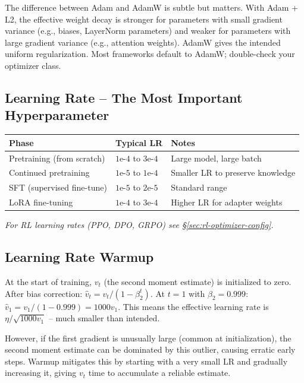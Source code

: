 \begin{warningbox}
The difference between Adam and AdamW is subtle but matters. With Adam + L2, the effective weight decay is stronger for parameters with small gradient variance (e.g., biases, LayerNorm parameters) and weaker for parameters with large gradient variance (e.g., attention weights). AdamW gives the intended uniform regularization. Most frameworks default to AdamW; double-check your optimizer class.
\end{warningbox}

\newpage
\subsection{Learning Rate -- The Most Important Hyperparameter}
\label{learning-rate-the-most-important-hyperparameter}

\begin{keybox}
\begin{tabular}{@{}lp{4cm}p{5.5cm}@{}}
\toprule
\textbf{Phase} & \textbf{Typical LR} & \textbf{Notes} \\
\midrule
Pretraining (from scratch) & $1\text{e-}4$ to $3\text{e-}4$ & Large model, large batch \\
Continued pretraining & $1\text{e-}5$ to $1\text{e-}4$ & Smaller LR to preserve knowledge \\
SFT (supervised fine-tune) & $1\text{e-}5$ to $2\text{e-}5$ & Standard range \\
LoRA fine-tuning & $1\text{e-}4$ to $3\text{e-}4$ & Higher LR for adapter weights \\
\bottomrule
\end{tabular}

\smallskip
\noindent\emph{For RL learning rates (PPO, DPO, GRPO) see §\ref{sec:rl-optimizer-config}.}
\end{keybox}

\subsection{Learning Rate Warmup}
\label{learning-rate-warmup}

\begin{keybox}
At the start of training, $v_t$ (the second moment estimate) is initialized to zero. After bias correction: $\hat{v}_t = v_t / (1 - \beta_2^t)$. At $t=1$ with $\beta_2 = 0.999$: $\hat{v}_1 = v_1 / (1 - 0.999) = 1000 v_1$. This means the effective learning rate is $\eta / \sqrt{1000 v_1}$ -- much smaller than intended.

However, if the first gradient is unusually large (common at initialization), the second moment estimate can be dominated by this outlier, causing erratic early steps. Warmup mitigates this by starting with a very small LR and gradually increasing it, giving $v_t$ time to accumulate a reliable estimate.
\end{keybox}

